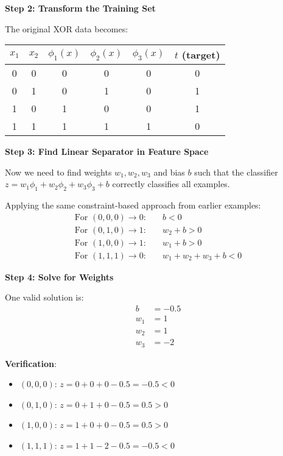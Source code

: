\textbf{Step 2: Transform the Training Set}

The original XOR data becomes:

\begin{center}
\begin{tabular}{|c|c||c|c|c||c|}
\hline
$x_1$ & $x_2$ & $\phi_1(x)$ & $\phi_2(x)$ & $\phi_3(x)$ & $t$ (target) \\
\hline
0 & 0 & 0 & 0 & 0 & 0 \\
0 & 1 & 0 & 1 & 0 & 1 \\
1 & 0 & 1 & 0 & 0 & 1 \\
1 & 1 & 1 & 1 & 1 & 0 \\
\hline
\end{tabular}
\end{center}

\textbf{Step 3: Find Linear Separator in Feature Space}

Now we need to find weights $w_1, w_2, w_3$ and bias $b$ such that the classifier $z = w_1\phi_1 + w_2\phi_2 + w_3\phi_3 + b$ correctly classifies all examples.

Applying the same constraint-based approach from earlier examples:
\begin{align}
\text{For } (0,0,0) \rightarrow 0: &\quad b < 0 \\
\text{For } (0,1,0) \rightarrow 1: &\quad w_2 + b > 0 \\
\text{For } (1,0,0) \rightarrow 1: &\quad w_1 + b > 0 \\
\text{For } (1,1,1) \rightarrow 0: &\quad w_1 + w_2 + w_3 + b < 0
\end{align}

\textbf{Step 4: Solve for Weights}

One valid solution is:
\begin{align}
b &= -0.5 \\
w_1 &= 1 \\
w_2 &= 1 \\
w_3 &= -2
\end{align}

\textbf{Verification}:
\begin{itemize}
    \item $(0,0,0)$: $z = 0 + 0 + 0 - 0.5 = -0.5 < 0$ \checkmark
    \item $(0,1,0)$: $z = 0 + 1 + 0 - 0.5 = 0.5 > 0$ \checkmark
    \item $(1,0,0)$: $z = 1 + 0 + 0 - 0.5 = 0.5 > 0$ \checkmark
    \item $(1,1,1)$: $z = 1 + 1 - 2 - 0.5 = -0.5 < 0$ \checkmark
\end{itemize}

